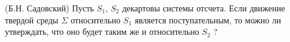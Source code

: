 (Б.Н. Садовский)
Пусть $S_{1}$, $S_{2}$  декартовы системы отсчета. Если движение твердой среды $\Sigma$
относительно $S_{1}$ является поступательным, то можно ли утверждать,
что оно будет таким же и относительно $S_{2}$ ?
